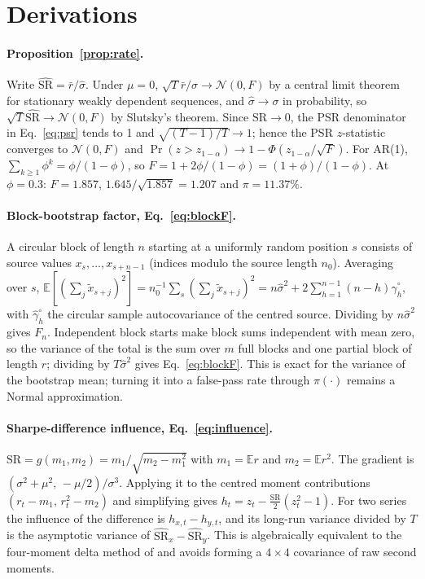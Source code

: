 \documentclass[11pt,a4paper]{article}
\newcommand{\SR}{\mathrm{SR}}
\newcommand{\hSR}{\widehat{\mathrm{SR}}}
\newcommand{\E}{\mathbb{E}}
\begin{document}
\section{Derivations}\label{app:derivations}

\paragraph{Proposition~\ref{prop:rate}.} Write $\hSR=\bar r/\hat\sigma$. Under $\mu=0$, $\sqrt T\bar r/\sigma\to\mathcal N(0,F)$ by a central limit theorem for stationary weakly dependent sequences, and $\hat\sigma\to\sigma$ in probability, so $\sqrt T\hSR\to\mathcal N(0,F)$ by Slutsky's theorem. Since $\hSR\to0$, the PSR denominator in Eq.~\eqref{eq:psr} tends to 1 and $\sqrt{(T-1)/T}\to1$; hence the PSR $z$-statistic converges to $\mathcal N(0,F)$ and $\Pr(z>z_{1-\alpha})\to1-\Phi(z_{1-\alpha}/\sqrt F)$. For AR(1), $\sum_{k\ge1}\phi^k=\phi/(1-\phi)$, so $F=1+2\phi/(1-\phi)=(1+\phi)/(1-\phi)$. At $\phi=0.3$: $F=1.857$, $1.645/\sqrt{1.857}=1.207$ and $\pi=11.37\%$.

\paragraph{Block-bootstrap factor, Eq.~\eqref{eq:blockF}.} A circular block of length $n$ starting at a uniformly random position $s$ consists of source values $x_{s},\dots,x_{s+n-1}$ (indices modulo the source length $n_0$). Averaging over $s$, $\E[(\sum_{j}\tilde x_{s+j})^2]=n_0^{-1}\sum_s(\sum_j\tilde x_{s+j})^2=n\hat\sigma^2+2\sum_{h=1}^{n-1}(n-h)\hat\gamma^{\circ}_h$, with $\hat\gamma^\circ_h$ the circular sample autocovariance of the centred source. Dividing by $n\hat\sigma^2$ gives $F_n$. Independent block starts make block sums independent with mean zero, so the variance of the total is the sum over $m$ full blocks and one partial block of length $r$; dividing by $T\hat\sigma^2$ gives Eq.~\eqref{eq:blockF}. This is exact for the variance of the bootstrap mean; turning it into a false-pass rate through $\pi(\cdot)$ remains a Normal approximation.

\paragraph{Sharpe-difference influence, Eq.~\eqref{eq:influence}.} $\SR=g(m_1,m_2)=m_1/\sqrt{m_2-m_1^2}$ with $m_1=\E r$ and $m_2=\E r^2$. The gradient is $(\sigma^2+\mu^2,\,-\mu/2)/\sigma^3$. Applying it to the centred moment contributions $(r_t-m_1,\,r_t^2-m_2)$ and simplifying gives $h_t=z_t-\tfrac{\SR}{2}(z_t^2-1)$. For two series the influence of the difference is $h_{x,t}-h_{y,t}$, and its long-run variance divided by $T$ is the asymptotic variance of $\hSR_x-\hSR_y$. This is algebraically equivalent to the four-moment delta method of \citet[Eqs.~1--5]{ledoit2008} and avoids forming a $4\times4$ covariance of raw second moments.
\end{document}
